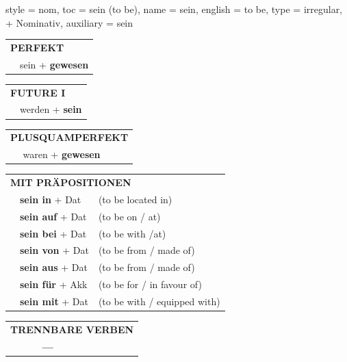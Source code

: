 \begin{verbentry}{
  style = {nom},
  toc = {sein (to be)},
  name = {sein},
  english = {to be},
  type = {irregular, + Nominativ},
  auxiliary = {sein}
}
    \vspace{10pt}
 
    \begin{tabular}{ll}
     \multicolumn{2}{l}{\textbf{PERFEKT}}\\
   &  sein + \textbf{gewesen}\\
  \end{tabular}
\hfill
   \begin{tabular}{ll}
   
    \multicolumn{2}{l}{\textbf{FUTURE I}}\\
   & werden + \textbf{sein}\\
 
  \end{tabular}
\hfill
   \begin{tabular}{ll}
      \multicolumn{2}{l}{\textbf{PLUSQUAMPERFEKT}}\\
   & waren + \textbf{gewesen}\\
  \end{tabular}
  
  \vspace{10pt}

   \begin{tabular}{lll}
      \multicolumn{3}{l}{\textbf{MIT PRÄPOSITIONEN}}\\
& \textbf{sein in} + Dat & (to be located in)\\
& \textbf{sein auf} + Dat & (to be on / at)\\
&\textbf{sein bei} + Dat & (to be with /at)\\
&\textbf{sein von} + Dat & (to be from / made of)\\
&\textbf{sein aus} + Dat & (to be from / made of)\\
&\textbf{sein für} + Akk & (to be for / in favour of)\\
&\textbf{sein mit} + Dat & (to be with / equipped with)
  \end{tabular}
\hfill
\begin{tabular}{lll}
\multicolumn{3}{l}{\textbf{TRENNBARE VERBEN}}\\
& \textbf{---} & \\
\end{tabular}
  \hfill



  \vspace{-5pt}
\end{verbentry}

